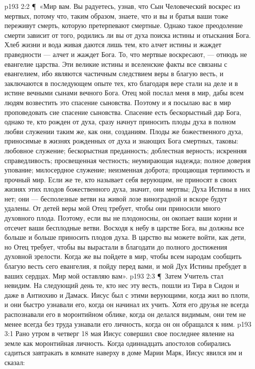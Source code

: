 \vs p193 2:2 \P\ «Мир вам. Вы радуетесь, узнав, что Сын Человеческий воскрес из мертвых, потому что, таким образом, знаете, что и вы и братья ваши тоже переживут смерть, которую претерпевают смертные. Однако такое преодоление смерти зависит от того, родились ли вы от духа поиска истины и отыскания Бога. Хлеб жизни и вода живая даются лишь тем, кто алчет истины и жаждет праведности --- алчет и жаждет Бога. То, что мертвые воскресают, --- отнюдь не евангелие царства. Эти великие истины и вселенские факты все связаны с евангелием, ибо являются частичным следствием веры в благую весть, и заключаются в последующем опыте тех, кто благодаря вере стали на деле и в истине вечными сынами вечного Бога. Отец мой послал меня в мир, дабы всем людям возвестить это спасение сыновства. Поэтому и я посылаю вас в мир проповедовать сие спасение сыновства. Спасение есть бескорыстный дар Бога, однако те, кто рожден от духа, сразу начнут приносить плоды духа в полном любви служении таким же, как они, созданиям. Плоды же божественного духа, приносимые в жизнях рожденных от духа и знающих Бога смертных, таковы: любовное служение; бескорыстная преданность; доблестная верность; искренняя справедливость; просвещенная честность; неумирающая надежда; полное доверия упование; милосердное служение; неизменная доброта; прощающая терпимость и прочный мир. Если же те, кто называет себя верующим, не приносят в своих жизнях этих плодов божественного духа, значит, они мертвы; Духа Истины в них нет; они --- бесполезные ветви на живой лозе виноградной и вскоре будут удалены. От детей веры мой Отец требует, чтобы они приносили много духовного плода. Поэтому, если вы не плодоносны, он окопает ваши корни и отсечет ваши бесплодные ветви. Восходя к небу в царстве Бога, вы должны все больше и больше приносить плодов духа. В царство вы можете войти, как дети, но Отец требует, чтобы вы вырастали в благодати до полного достижения духовной зрелости. Когда же вы пойдете в мир, чтобы всем народам сообщить благую весть сего евангелия, я пойду перед вами, и мой Дух Истины пребудет в ваших сердцах. Мир мой оставляю вам».
\vs p193 2:3 \P\ Затем Учитель стал невидим. На следующий день те, кто нес эту весть, пошли из Тира в Сидон и даже в Антиохию и Дамаск. Иисус был с этими верующими, когда жил во плоти, и они быстро узнавали его, когда он начинал их учить. Хотя его друзья не всегда распознавали его в моронтийном облике, когда он делался видимым, они тем не менее всегда без труда узнавали его личность, когда он он обращался к ним.
\vs p193 3:1 Рано утром в четверг 18 мая Иисус совершил свое последнее явление на земле как моронтийная личность. Когда одиннадцать апостолов собирались садиться завтракать в комнате наверху в доме Марии Марк, Иисус явился им и сказал:
